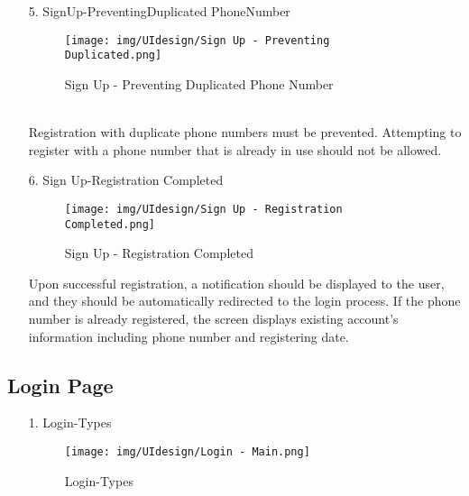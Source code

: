 \documentclass[conference]{IEEEtran}
\begin{document}
\begin{enumerate}
\begin{itemize}
\begin{itemize}
\begin{enumerate}
\begin{enumerate}
    \item[5.] Sign\hspace{0.5em}Up-Preventing\hspace{0.5em}Duplicated PhoneNumber
    \begin{figure}[h]
        {\centering
        \hspace{4cm}
        \begin{minipage}{0.4\columnwidth}
        \texttt{[image: img/UIdesign/Sign Up - Preventing Duplicated.png]}
            \caption{Sign Up - Preventing Duplicated Phone Number}
        \end{minipage}}
    \end{figure}
    \\ Registration with duplicate phone numbers must be prevented. Attempting to register with a phone number that is already in use should not be allowed. \\ 
\end{enumerate}

\begin{enumerate}
    \item[6.] Sign Up-Registration Completed
    \begin{figure}[h]
        {\centering
        \hspace{4cm}
        \begin{minipage}{0.4\columnwidth}
            \texttt{[image: img/UIdesign/Sign Up - Registration Completed.png]}
            \caption{Sign Up - Registration Completed}
        \end{minipage}}
    \end{figure}
    
    Upon successful registration, a notification should be displayed to the user, and they should be automatically redirected to the login process. If the phone number is already registered, the screen displays existing account’s information including phone number and registering date.
\end{enumerate}

\subsection{Login Page}

\begin{enumerate}
    \item[1.] Login-Types
    \begin{figure}[h]
        {\centering
        \hspace{4cm}
        \begin{minipage}{0.4\columnwidth}
        \texttt{[image: img/UIdesign/Login - Main.png]}
            \caption{Login-Types}
        \end{minipage}}
    \end{figure}
    

\end{enumerate}
\end{enumerate}
\end{itemize}
\end{itemize}
\end{enumerate}
\end{document}
